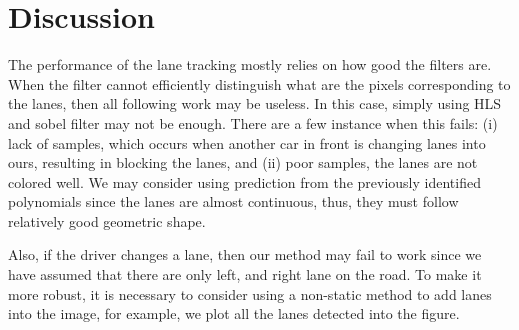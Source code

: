 \documentclass[draftcls,onecolumn,12pt]{IEEEtran}
\theoremstyle{plain}
\theoremstyle{plain}
\begin{document}
\section{Discussion}
The performance of the lane tracking mostly relies on how good the filters are. When the filter cannot efficiently distinguish what are the pixels corresponding to the lanes, then all following work may be useless. In this case, simply using HLS and sobel filter may not be enough. There are a few instance when this fails: (i) lack of samples, which occurs when another car in front is changing lanes into ours, resulting in blocking the lanes, and (ii) poor samples, the lanes are not colored well. We may consider using prediction from the previously identified polynomials since the lanes are almost continuous, thus, they must follow relatively good geometric shape. 

Also, if the driver changes a lane, then our method may fail to work since we have assumed that there are only left, and right lane on the road. To make it more robust, it is necessary to consider using a non-static method to add lanes into the image, for example, we plot all the lanes detected into the figure.
\end{document}
